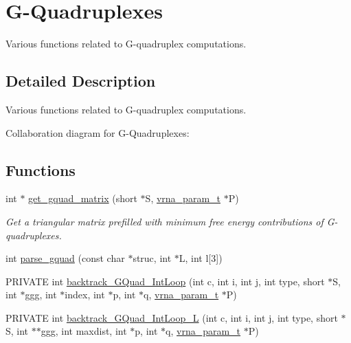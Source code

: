 \hypertarget{group__gquads}{}\section{G-\/\+Quadruplexes}
\label{group__gquads}


Various functions related to G-\/quadruplex computations.  




\subsection{Detailed Description}
Various functions related to G-\/quadruplex computations. 

Collaboration diagram for G-\/\+Quadruplexes\+:
\subsection*{Functions}
\begin{DoxyCompactItemize}
\item 
int $\ast$ \mbox{\hyperlink{group__gquads_ga392e45c9615aa123737671603fa4203c}{get\+\_\+gquad\+\_\+matrix}} (short $\ast$S, \mbox{\hyperlink{group__energy__parameters_ga8a69ca7d787e4fd6079914f5343a1f35}{vrna\+\_\+param\+\_\+t}} $\ast$P)
\begin{DoxyCompactList}\small\item\em Get a triangular matrix prefilled with minimum free energy contributions of G-\/quadruplexes. \end{DoxyCompactList}\item 
int \mbox{\hyperlink{group__gquads_gae41763215b9c64d2a7b67f0df8a28078}{parse\+\_\+gquad}} (const char $\ast$struc, int $\ast$L, int l\mbox{[}3\mbox{]})
\item 
P\+R\+I\+V\+A\+TE int \mbox{\hyperlink{group__gquads_ga220c41e8dbcee940ac975b8ce88e55c5}{backtrack\+\_\+\+G\+Quad\+\_\+\+Int\+Loop}} (int c, int i, int j, int type, short $\ast$S, int $\ast$ggg, int $\ast$index, int $\ast$p, int $\ast$q, \mbox{\hyperlink{group__energy__parameters_ga8a69ca7d787e4fd6079914f5343a1f35}{vrna\+\_\+param\+\_\+t}} $\ast$P)
\item 
P\+R\+I\+V\+A\+TE int \mbox{\hyperlink{group__gquads_ga7b371308fa5a45c7ac353ef6ed1014de}{backtrack\+\_\+\+G\+Quad\+\_\+\+Int\+Loop\+\_\+L}} (int c, int i, int j, int type, short $\ast$S, int $\ast$$\ast$ggg, int maxdist, int $\ast$p, int $\ast$q, \mbox{\hyperlink{group__energy__parameters_ga8a69ca7d787e4fd6079914f5343a1f35}{vrna\+\_\+param\+\_\+t}} $\ast$P)
\end{DoxyCompactItemize}


